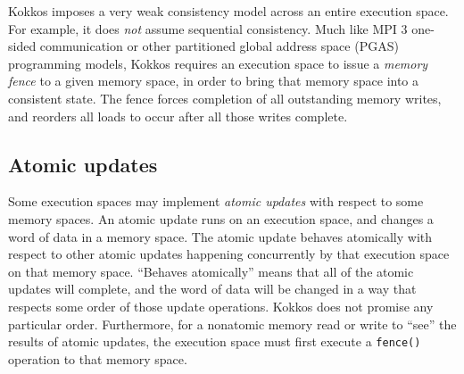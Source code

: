 Kokkos imposes a very weak consistency model across an entire execution space.
For example, it does \emph{not} assume sequential consistency.
Much like MPI 3 one-sided communication
or other partitioned global address space (PGAS) programming models,
Kokkos requires an execution space to issue a \emph{memory fence}
to a given memory space, 
in order to bring that memory space into a consistent state.
The fence forces completion of all outstanding memory writes,
and reorders all loads to occur after all those writes complete.

\subsection{Atomic updates}\label{SS:Model:Consistency:Atomic}

Some execution spaces may implement \emph{atomic updates} with respect to some memory spaces.
An atomic update runs on an execution space, and changes a word of data in a memory space.
The atomic update behaves atomically with respect to other atomic updates happening concurrently by that execution space on that memory space.
``Behaves atomically'' means that all of the atomic updates will complete,
and the word of data will be changed in a way that respects some order of those update operations.
Kokkos does not promise any particular order.
Furthermore, for a nonatomic memory read or write to ``see'' the results of atomic updates,
the execution space must first execute a \lstinline!fence()! operation to that memory space.
